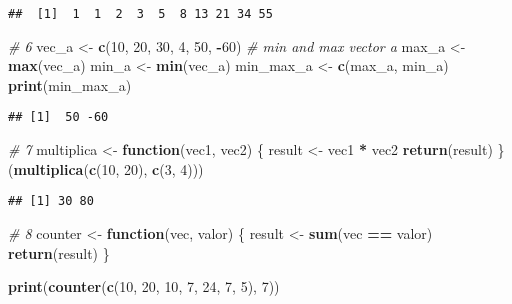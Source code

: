 \documentclass[
]{article}
\newenvironment{Shaded}{\begin{snugshade}}{\end{snugshade}}
\newcommand{\CommentTok}[1]{\textcolor[rgb]{0.56,0.35,0.01}{\textit{#1}}}
\newcommand{\ControlFlowTok}[1]{\textcolor[rgb]{0.13,0.29,0.53}{\textbf{#1}}}
\newcommand{\DecValTok}[1]{\textcolor[rgb]{0.00,0.00,0.81}{#1}}
\newcommand{\FunctionTok}[1]{\textcolor[rgb]{0.13,0.29,0.53}{\textbf{#1}}}
\newcommand{\NormalTok}[1]{#1}
\newcommand{\OtherTok}[1]{\textcolor[rgb]{0.56,0.35,0.01}{#1}}
\newcommand{\SpecialCharTok}[1]{\textcolor[rgb]{0.81,0.36,0.00}{\textbf{#1}}}
\begin{document}
\begin{verbatim}
##  [1]  1  1  2  3  5  8 13 21 34 55
\end{verbatim}

\begin{Shaded}
\begin{Highlighting}[]
\CommentTok{\# 6}
\NormalTok{vec\_a }\OtherTok{\textless{}{-}} \FunctionTok{c}\NormalTok{(}\DecValTok{10}\NormalTok{, }\DecValTok{20}\NormalTok{, }\DecValTok{30}\NormalTok{, }\DecValTok{4}\NormalTok{, }\DecValTok{50}\NormalTok{, }\SpecialCharTok{{-}}\DecValTok{60}\NormalTok{)}
\CommentTok{\# min and max vector a}
\NormalTok{max\_a }\OtherTok{\textless{}{-}} \FunctionTok{max}\NormalTok{(vec\_a)}
\NormalTok{min\_a }\OtherTok{\textless{}{-}} \FunctionTok{min}\NormalTok{(vec\_a)}
\NormalTok{min\_max\_a }\OtherTok{\textless{}{-}} \FunctionTok{c}\NormalTok{(max\_a, min\_a)}
\FunctionTok{print}\NormalTok{(min\_max\_a)}
\end{Highlighting}
\end{Shaded}

\begin{verbatim}
## [1]  50 -60
\end{verbatim}

\begin{Shaded}
\begin{Highlighting}[]
\CommentTok{\# 7}
\NormalTok{multiplica }\OtherTok{\textless{}{-}} \ControlFlowTok{function}\NormalTok{(vec1, vec2) \{}
\NormalTok{  result }\OtherTok{\textless{}{-}}\NormalTok{ vec1 }\SpecialCharTok{*}\NormalTok{ vec2}
  \FunctionTok{return}\NormalTok{(result)}
\NormalTok{\}}
\NormalTok{(}\FunctionTok{multiplica}\NormalTok{(}\FunctionTok{c}\NormalTok{(}\DecValTok{10}\NormalTok{, }\DecValTok{20}\NormalTok{), }\FunctionTok{c}\NormalTok{(}\DecValTok{3}\NormalTok{, }\DecValTok{4}\NormalTok{)))}
\end{Highlighting}
\end{Shaded}

\begin{verbatim}
## [1] 30 80
\end{verbatim}

\begin{Shaded}
\begin{Highlighting}[]
\CommentTok{\# 8}
\NormalTok{counter }\OtherTok{\textless{}{-}} \ControlFlowTok{function}\NormalTok{(vec, valor) \{}
\NormalTok{  result }\OtherTok{\textless{}{-}} \FunctionTok{sum}\NormalTok{(vec }\SpecialCharTok{==}\NormalTok{ valor)}
  \FunctionTok{return}\NormalTok{(result)}
\NormalTok{\}}

\FunctionTok{print}\NormalTok{(}\FunctionTok{counter}\NormalTok{(}\FunctionTok{c}\NormalTok{(}\DecValTok{10}\NormalTok{, }\DecValTok{20}\NormalTok{, }\DecValTok{10}\NormalTok{, }\DecValTok{7}\NormalTok{, }\DecValTok{24}\NormalTok{, }\DecValTok{7}\NormalTok{, }\DecValTok{5}\NormalTok{), }\DecValTok{7}\NormalTok{))}
\end{Highlighting}
\end{Shaded}
\end{document}

